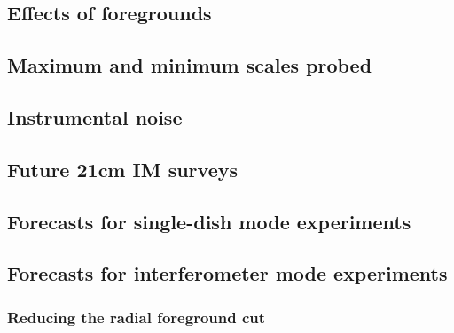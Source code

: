 \subsection{Effects of foregrounds}


\subsection{Maximum and minimum scales probed}
%

\subsection{Instrumental noise}\label{ssec:inoise}


\subsection{Future 21cm IM surveys}

\subsection{Forecasts for single-dish mode experiments}

\subsection{Forecasts for interferometer mode experiments}

\subsubsection{Reducing the radial foreground cut}
